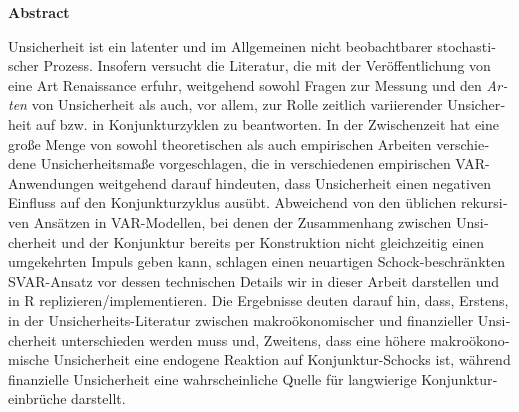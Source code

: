 \documentclass[a4paper,11pt,listof=nochaptergap,oneside,pointednumbers,bibtotoc,bigheadings,liststotoc,hidelinks]{scrbook}
\makeatletter
\theoremstyle{mysatz}
\theoremstyle{mydefinition}
\theoremstyle{mytheorem}
\theoremstyle{mybemerkung}
\newcommand\abstractname{Abstract}  %
\newenvironment{abstract}{%
      \titlepage
      \null\vfil
      \@beginparpenalty\@lowpenalty
      \begin{center}%
        \bfseries \abstractname
        \@endparpenalty\@M
      \end{center}}%
     {\par\vfil\null\endtitlepage}
\newenvironment{abstract}{%
      \if@twocolumn
        \section*{\abstractname}%
      \else
        \small
        \begin{center}%
          {\bfseries \abstractname\vspace{-.5em}\vspace{\z@}}%
        \end{center}%
        \quotation
      \fi}
      {\if@twocolumn\else\endquotation\fi}
\makeatother
\begin{document}
\begin{otherlanguage}{ngerman}
\begin{abstract}
Unsicherheit ist ein latenter und im Allgemeinen nicht beobachtbarer stochastischer Prozess. Insofern versucht die Literatur, die mit der Veröffentlichung von \citet{bloom:09} eine Art Renaissance erfuhr, weitgehend sowohl Fragen zur Messung und den \textit{Arten} von Unsicherheit als auch, vor allem, zur Rolle zeitlich variierender Unsicherheit auf bzw. in Konjunkturzyklen zu beantworten. In der Zwischenzeit hat eine große Menge von sowohl theoretischen als auch empirischen Arbeiten verschiedene Unsicherheitsmaße vorgeschlagen, die in verschiedenen empirischen VAR-Anwendungen weitgehend darauf hindeuten, dass Unsicherheit einen negativen Einfluss auf den Konjunkturzyklus ausübt. Abweichend von den üblichen rekursiven Ansätzen in VAR-Modellen, bei denen der Zusammenhang zwischen Unsicherheit und der Konjunktur bereits per Konstruktion nicht gleichzeitig einen umgekehrten Impuls geben kann, schlagen \citet{ludvigsonetal:18} einen neuartigen Schock-beschränkten SVAR-Ansatz vor dessen technischen Details wir in dieser Arbeit darstellen und in R replizieren/implementieren. Die Ergebnisse deuten darauf hin, dass, Erstens, in der Unsicherheits-Literatur zwischen makroökonomischer und finanzieller Unsicherheit unterschieden werden muss und, Zweitens, dass eine höhere makroökonomische Unsicherheit eine endogene Reaktion auf Konjunktur-Schocks ist, während finanzielle Unsicherheit eine wahrscheinliche Quelle für langwierige Konjunktureinbrüche darstellt.
\end{abstract}
\end{otherlanguage}






\restoregeometry

\thispagestyle{empty}
\pagestyle{fancy} %
\setcounter{page}{7} %
\tableofcontents
\newpage
\listoffigures

\newpage
\listoftables

\newpage

\end{document}
